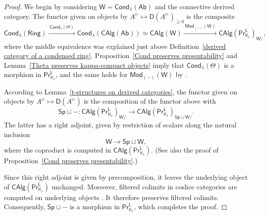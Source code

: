 \begin{proof}
We begin by considering $\mathsf{W}=\mathsf{Cond}_\lambda(\mathsf{Ab})$ and the connective derived category. The functor given on objects by $A^\triangleright\mapsto\mathsf{D}(A^{\triangleright})_{\geq0}$ is the composite
    \[\mathsf{Cond}_\lambda(\mathsf{Ring}) \xrightarrow{\ \mathsf{Cond}_\lambda(\Theta)\ }\mathsf{Cond}_\lambda(\mathsf{CAlg}(\mathsf{Ab}))\simeq \mathsf{CAlg}(\mathsf{W})\xrightarrow{\ \mathsf{Mod}_{(-)}(\mathsf{W}) \ }\mathsf{CAlg}(\mathsf{Pr}^{\mathsf{L}}_{\aleph_1})_{\mathsf{W}/},\]
    where the middle equivalence was explained just above Definition~\ref{derived category of a condensed ring}. Proposition~\ref{Cond preserves presentability} and Lemma~\ref{Theta preserves kappa-compact objects} imply that $\mathsf{Cond}_{\lambda}(\Theta)$ is a morphism in $\mathsf{Pr}^{\mathsf{L}}_{\aleph_1}$, and the same holds for $\mathsf{Mod}_{(-)}(\mathsf{W})$ by \cite[Lem.~2.11]{aoki2025higherpresentablecategorieslimits}.

    According to Lemma~\ref{t-structures on derived categories}, the functor given on objects by $A^\triangleright\mapsto\mathsf{D}(A^{\triangleright})$ is the composition of the functor above with
    \[\mathsf{Sp}\sqcup - \colon \mathsf{CAlg}(\mathsf{Pr}^{\mathsf{L}}_{\aleph_1})_{\mathsf{W}/}\to \mathsf{CAlg}(\mathsf{Pr}^{\mathsf{L}}_{\aleph_1})_{\mathsf{Sp}\sqcup\mathsf{W}/}.\]
    The latter has a right adjoint, given by restriction of scalars along the natural inclusion
    \[\mathsf{W}\to \mathsf{Sp}\sqcup \mathsf{W},\]
    where the coproduct is computed in $\mathsf{CAlg}(\mathsf{Pr}^{\mathsf{L}}_{\aleph_1})$. (See also the proof of Proposition~\ref{Cond preserves presentability}.)

    Since this right adjoint is given by precomposition, it leaves the underlying object of $\mathsf{CAlg}(\mathsf{Pr}^{\mathsf{L}}_{\aleph_1})$ unchanged. Moreover, filtered colimits in coslice categories are computed on underlying objects \cite[Tags~\href{https://kerodon.net/tag/0236}{0236}, \href{https://kerodon.net/tag/02KT}{02KT}, and \href{https://kerodon.net/tag/02PH}{02PH}]{kerodon}. It therefore preserves filtered colimits. Consequently, $\mathsf{Sp}\sqcup -$ is a morphism in $\mathsf{Pr}^{\mathsf{L}}_{\aleph_1}$, which completes the proof.
\end{proof}
